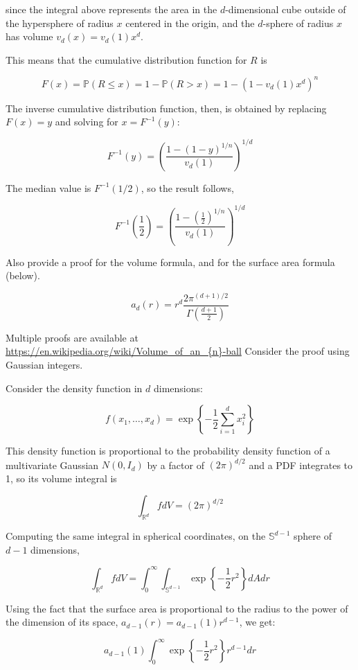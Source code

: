 since the integral above represents the area in the \(d\)-dimensional
cube outside of the hypersphere of radius \(x\) centered in the origin,
and the \(d\)-sphere of radius \(x\) has volume \(v_d(x) = v_d(1) x^{d}\).

This means that the cumulative distribution function for \(R\) is

\[F(x) = \mathbb{P}(R \leq x) = 1 - \mathbb{P}(R > x) = 1 - \left(1 - v_d(1) x^{d}\right)^{n}\]

The inverse cumulative distribution function, then, is obtained by
replacing \(F(x) = y\) and solving for \(x = F^{-1}(y)\):

\[ F^{-1}(y) = \left( \frac{1 - (1 - y)^{1/n}}{v_d(1)} \right)^{1/d} \]

The median value is \(F^{-1}(1/2)\), so the result follows,

\[ F^{-1}\left( \frac{1}{2} \right) = \left( \frac{1 - \left( \frac{1}{2} \right)^{1/n}}{v_d(1)} \right)^{1/d}\]

Also provide a proof for the volume formula, and for the surface
area formula (below).

\[ a_d(r) = r^{d} \frac{2 \pi^{(d + 1)/2}}{\Gamma \left( \frac{d + 1}{2}\right)}  \]

Multiple proofs are available at
\url{https://en.wikipedia.org/wiki/Volume\_of\_an_{n}-ball}
Consider the proof using Gaussian integers.

Consider the density function in \(d\) dimensions:

\[ f(x_{1}, \dots, x_d) = \exp \left\{ -\frac{1}{2} \sum_{i=1}^{d} x_{i}^{2} \right\} \]

This density function is proportional to the probability density
function of a multivariate Gaussian \(N(0, I_d)\) by a factor of
\((2 \pi)^{d/2}\) and a PDF integrates to 1, so its volume integral is

\[ \int_{\mathbb{R}^{d}} f dV = (2 \pi)^{d/2}\]

Computing the same integral in spherical coordinates, on the
\(\mathbb{S}^{d - 1}\) sphere of \(d - 1\) dimensions,

\[ \int_{\mathbb{R}^{d}} f dV = \int_{0}^{\infty} \int_{\mathbb{S}^{d - 1}} \exp \left\{ -\frac{1}{2} r^{2} \right\} dA dr \]

Using the fact that the surface area is proportional to the radius to
the power of the dimension of its space,
\(a_{d-1}(r) = a_{d-1}(1) r^{d-1}\), we get:

\[ a_{d-1}(1) \int_{0}^{\infty} \exp \left\{ -\frac{1}{2} r^{2} \right\} r^{d - 1} dr \]

